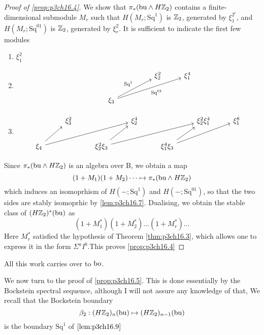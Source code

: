 \documentclass[../main]{subfiles}
\begin{document}
   \begin{proof}[Proof of \ref{prop:p3ch16.4}] We show that $\pi_{\ast}(\mathrm{bu} \wedge H\mathbb{Z}_2)$ contains a finite-dimensional submodule $M_{r}$ such that $H(M_{r};\mathrm{Sq}^{1})$ is $\mathbb{Z}_2$, generated by $\xi_{1}^{2^{r}}$, and $H(M_{r};\mathrm{Sq}^{01})$ is $\mathbb{Z}_2$, generated by $\xi_{r}^{2}$. It is sufficient to indicate the first few modules \begin{enumerate}
       \item $\xi_{1}^{2}$
       \item 
\[\begin{tikzcd}
	{} &&& {\xi_{2}^{2}} & {\xi_{1}^{4}} \\
	& {\xi_{3}}
	\arrow["{\mathrm{Sq}^{1}}", from=2-2, to=1-4]
	\arrow["{\mathrm{Sq}^{01}}"', from=2-2, to=1-5]
\end{tikzcd}\]
\item \[\begin{tikzcd}
	& {\xi_{3}^{2}} && {\xi_{2}^{4}} && {\xi_{2}^{2}\xi_{1}^{4}} & {\xi_{1}^{8}} \\
	{\xi_{4}} && {\xi_{2}^{2}\xi_{3}} && {\xi_{1}^{4}\xi_{3}}
	\arrow[from=2-1, to=1-2]
	\arrow[from=2-1, to=1-4]
	\arrow[from=2-3, to=1-4]
	\arrow[from=2-3, to=1-6]
	\arrow[from=2-5, to=1-6]
	\arrow[from=2-5, to=1-7]
\end{tikzcd}\]
   \end{enumerate}
   Since $\pi_{\ast}(\mathrm{bu} \wedge H\mathbb{Z}_2)$ is an algebra over B, we obtain a map \begin{equation*}
       (1+M_{1})(1+M_{2})\dots \mapsto \pi_{\ast}(\mathrm{bu} \wedge H\mathbb{Z}_2)
   \end{equation*}
   which induces an isomoprhism of $H(-;\mathrm{Sq}^{1})$ and $H(-;\mathrm{Sq}^{01})$, so that the two sides are stably isomoprhic by \ref{lem:p3ch16.7}. Dualising, we obtain the stable class of $(H\mathbb{Z}_2)^{\ast}(\mathrm{bu})$ as \begin{equation*}
        (1+M_{1}^{\ast})(1+M_{2}^{\ast})\dots(1+M_{r}^{\ast})\dots
   \end{equation*}
   Here $M_{r}^{\ast}$ satisfied the hypothesis of Theorem \ref{thm:p3ch16.3}, which allows one to express it in the form  $\Sigma^{a}I^{b}$.This proves \ref{prop:p3ch16.4}
   \end{proof}
   
    All this work carries over to $\mathrm{bo}$.
    
    We now turn to the proof of \ref{prop:p3ch16.5}. This is done essentially by the
Bockstein spectral sequence, although I will not assure any knowledge of
that, We recall that the Bockstein boundary \begin{equation*}
    \beta_{2}:(H\mathbb{Z}_2)_{n}(\mathrm{bu}) \mapsto (H\mathbb{Z}_2)_{n-1}(\mathrm{bu}) 
\end{equation*}
    is the boundary $\mathrm{Sq}^{1}$ of $\ref{lem:p3ch16.9}$ 
\end{document}
